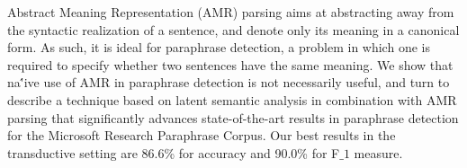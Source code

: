 Abstract Meaning Representation (AMR) parsing aims at abstracting away from the syntactic realization of a sentence, and denote only its meaning in a canonical form. As such, it is ideal for paraphrase detection, a problem in which one is required to specify whether two sentences have the same meaning. We show that na\''{i}ve use of AMR in paraphrase detection is not necessarily useful, and turn to describe a technique based on latent semantic analysis in combination with AMR parsing that significantly advances state-of-the-art results in paraphrase detection for the Microsoft Research Paraphrase Corpus. Our best results in the transductive setting are 86.6\% for accuracy and 90.0\% for F$\_1$ measure.
